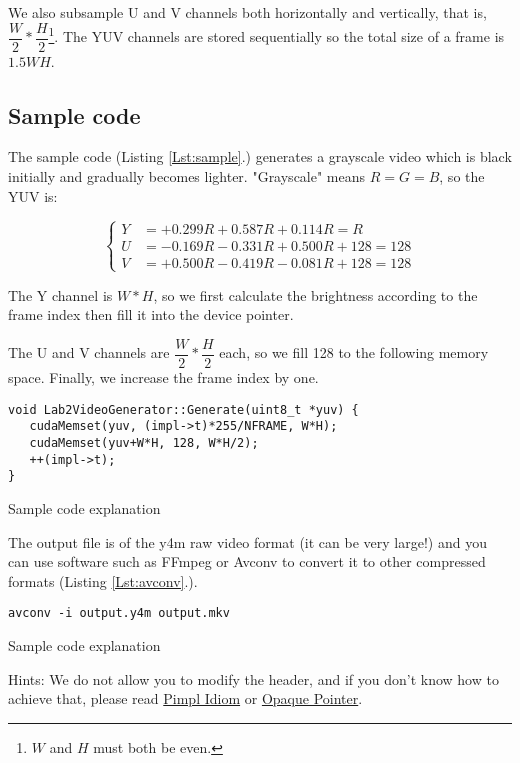 \documentclass[12pt,a4paper]{article}
\newcommand{\lstref}[1]{Listing \ref{Lst:#1}.}
\begin{document}
We also subsample U and V channels both horizontally and vertically,
that is, 
$\dfrac{W}{2}*\dfrac{H}{2}$\footnote{$W$ and $H$ must both be even.}.
The YUV channels are stored sequentially so the total size of a frame is $1.5WH$.

\subsection{Sample code}
The sample code (\lstref{sample}) generates a grayscale video
which is black initially and gradually becomes lighter.
"Grayscale" means $R=G=B$, so the YUV is:

\begin{equation}
\left\lbrace
\begin{aligned}
Y &= +0.299R+0.587R+0.114R = R\\
U &= -0.169R-0.331R+0.500R+128 = 128\\
V &= +0.500R-0.419R-0.081R+128 = 128
\end{aligned}
\right.
\end{equation}

The Y channel is $W*H$,
so we first calculate the brightness according to the frame index
then fill it into the device pointer.

The U and V channels are $\dfrac{W}{2}*\dfrac{H}{2}$ each,
so we fill 128 to the following memory space.
Finally, we increase the frame index by one.

\begin{listing}
\begin{verbatim}
void Lab2VideoGenerator::Generate(uint8_t *yuv) {
   cudaMemset(yuv, (impl->t)*255/NFRAME, W*H);
   cudaMemset(yuv+W*H, 128, W*H/2);
   ++(impl->t);
}
\end{verbatim}
\caption{Sample code explanation}\label{Lst:sample}
\end{listing}

The output file is of the y4m raw video format (it can be very large!)
and you can use software such as
FFmpeg or Avconv to convert it to other compressed formats (\lstref{avconv}).
\begin{listing}
\begin{verbatim}
avconv -i output.y4m output.mkv
\end{verbatim}
\caption{Sample code explanation}\label{Lst:avconv}
\end{listing}

Hints: We do not allow you to modify the header,
and if you don't know how to achieve that,
please read \href{https://stackoverflow.com/questions/8972588/is-the-pimpl-idiom-really-used-in-practice}{Pimpl Idiom} or \href{https://en.wikipedia.org/wiki/Opaque_pointer}{Opaque Pointer}.
\end{document}
